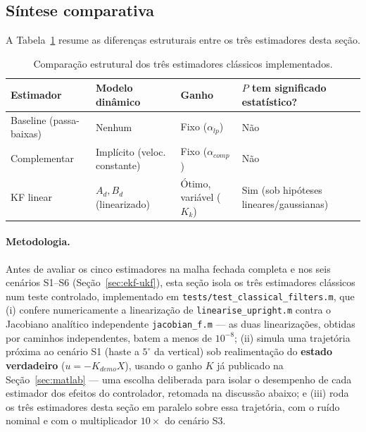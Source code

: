 \documentclass[brazil, 12pt]{article}
\begin{document}
\subsection{Síntese comparativa}
\label{sec:sintese-classicos}

A Tabela~\ref{tab:classicos} resume as diferenças estruturais entre os três
estimadores desta seção.

\begin{table}[H]
\centering
\small
\begin{tabular}{@{}p{3.1cm} p{3.4cm} p{2.6cm} p{3.3cm}@{}}
\hline
\textbf{Estimador} & \textbf{Modelo dinâmico} & \textbf{Ganho} & \textbf{$P$ tem significado estatístico?} \\
\hline
Baseline (passa-baixas)  & Nenhum                        & Fixo ($\alpha_{lp}$)             & Não \\[2pt]
Complementar             & Implícito (veloc. constante)  & Fixo ($\alpha_{comp}$)           & Não \\[2pt]
KF linear                & $A_d,B_d$ (linearizado)       & Ótimo, variável ($K_k$)          & Sim (sob hipóteses lineares/gaussianas) \\
\hline
\end{tabular}
\caption{Comparação estrutural dos três estimadores clássicos implementados.}
\label{tab:classicos}
\end{table}

\paragraph{Metodologia.} Antes de avaliar os cinco estimadores na malha
fechada completa e nos seis cenários S1--S6 (Seção~\ref{sec:ekf-ukf}), esta
seção isola os três estimadores clássicos num teste controlado, implementado
em \texttt{tests/test\_classical\_filters.m}, que (i) confere numericamente a
linearização de \texttt{linearise\_upright.m} contra o Jacobiano analítico
independente \texttt{jacobian\_f.m} — as duas linearizações, obtidas por
caminhos independentes, batem a menos de $10^{-8}$; (ii) simula uma
trajetória próxima ao cenário S1 (haste a $5^{\circ}$ da vertical) sob
realimentação do \textbf{estado verdadeiro} ($u=-K_{demo}X$), usando o ganho
$K$ já publicado na Seção~\ref{sec:matlab} — uma escolha deliberada para
isolar o desempenho de cada estimador dos efeitos do controlador, retomada na
discussão abaixo; e (iii) roda os três estimadores desta seção em paralelo
sobre essa trajetória, com o ruído nominal e com o multiplicador $10\times$ do
cenário S3.
\end{document}
